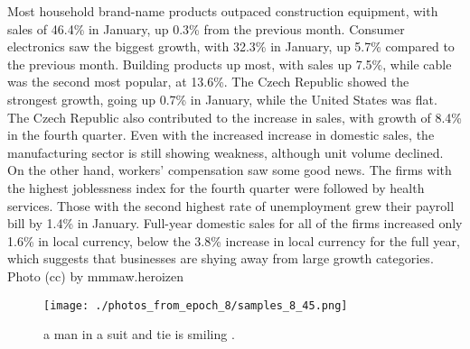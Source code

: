 \documentclass{article}%
\begin{document}
Most household brand{-}name products outpaced construction equipment, with sales of 46.4\% in January, up 0.3\% from the previous month. Consumer electronics saw the biggest growth, with 32.3\% in January, up 5.7\% compared to the previous month. Building products up most, with sales up 7.5\%, while cable was the second most popular, at 13.6\%.\newline%
The Czech Republic showed the strongest growth, going up 0.7\% in January, while the United States was flat. The Czech Republic also contributed to the increase in sales, with growth of 8.4\% in the fourth quarter. Even with the increased increase in domestic sales, the manufacturing sector is still showing weakness, although unit volume declined.\newline%
On the other hand, workers’ compensation saw some good news. The firms with the highest joblessness index for the fourth quarter were followed by health services. Those with the second highest rate of unemployment grew their payroll bill by 1.4\% in January.\newline%
Full{-}year domestic sales for all of the firms increased only 1.6\% in local currency, below the 3.8\% increase in local currency for the full year, which suggests that businesses are shying away from large growth categories.\newline%
Photo (cc) by mmmaw.heroizen\newline%

%


\begin{figure}[h!]%
\centering%
\texttt{[image: ./photos\_from\_epoch\_8/samples\_8\_45.png]}%
\caption{a man in a suit and tie is smiling .}%
\end{figure}

%
\end{document}
